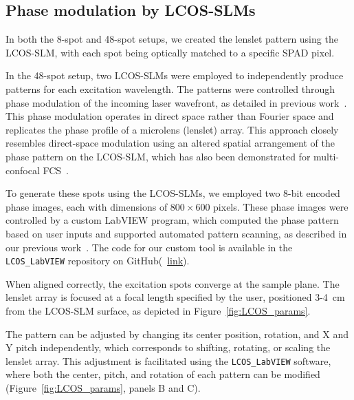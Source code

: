 \subsection{Phase modulation by LCOS-SLMs}
\label{sec:LCOS}

In both the 8-spot and 48-spot setups, we created the lenslet pattern using the \ac{LCOS-SLM}, with each spot being optically matched to a specific \ac{SPAD} pixel. 

In the 48-spot setup, two \ac{LCOS-SLM}s were employed to independently produce patterns for each excitation wavelength. 
The patterns were controlled through phase modulation of the incoming laser wavefront, as detailed in previous work~\cite{ingargiola_PLOS1_2016, colyer_BOE_2010}. 
This phase modulation operates in direct space rather than Fourier space and replicates the phase profile of a microlens (lenslet) array.
This approach closely resembles direct-space modulation using an altered spatial arrangement of the phase pattern on the \ac{LCOS-SLM}, which has also been demonstrated for multi-confocal \ac{FCS}~\cite{kloster-landsberg_RSI_2013}.

To generate these spots using the \ac{LCOS-SLM}s, we employed two 8-bit encoded phase images, each with dimensions of $800\times600$ pixels. 
These phase images were controlled by a custom LabVIEW program, which computed the phase pattern based on user inputs and supported automated pattern scanning, as described in our previous work~\cite{ingargiola_JCP_2018}. 
The code for our custom tool is available in the \texttt{LCOS\_LabVIEW} repository on GitHub(~\href{https://github.com/multispot-software/LCOS_LabVIEW}{link}).

When aligned correctly, the excitation spots converge at the sample plane. 
The lenslet array is focused at a focal length specified by the user, positioned 3-4~cm from the \ac{LCOS-SLM} surface, as depicted in Figure~\ref{fig:LCOS_params}. 

The pattern can be adjusted by changing its center position, rotation, and X and Y pitch independently, which corresponds to shifting, rotating, or scaling the lenslet array. 
This adjustment is facilitated using the \texttt{LCOS\_LabVIEW} software, where both the center, pitch, and rotation of each pattern can be modified (Figure~\ref{fig:LCOS_params}, panels B and C).

